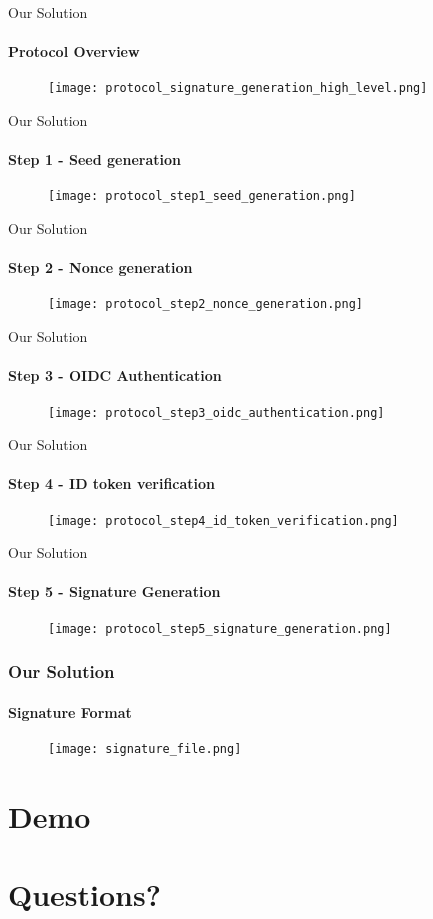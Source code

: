 \begin{frame}[t]{Our Solution}
	\framesubtitle{Protocol Overview}
	\begin{figure}[ht]
		\centering
		\texttt{[image: protocol\_signature\_generation\_high\_level.png]}
	\end{figure}
\end{frame}

\begin{frame}[t]{Our Solution}
	\framesubtitle{Step 1 - Seed generation}
	\begin{figure}[ht]
		\centering
		\texttt{[image: protocol\_step1\_seed\_generation.png]}
	\end{figure}
\end{frame}

\begin{frame}[t]{Our Solution}
	\framesubtitle{Step 2 - Nonce generation}
	\begin{figure}[ht]
		\centering
		\texttt{[image: protocol\_step2\_nonce\_generation.png]}
	\end{figure}
\end{frame}

\begin{frame}[t]{Our Solution}
	\framesubtitle{Step 3 - OIDC Authentication}
	\begin{figure}[ht]
		\centering
		\texttt{[image: protocol\_step3\_oidc\_authentication.png]}
	\end{figure}
\end{frame}

\begin{frame}[t]{Our Solution}
	\framesubtitle{Step 4 - ID token verification}
	\begin{figure}[ht]
		\centering
		\texttt{[image: protocol\_step4\_id\_token\_verification.png]}
	\end{figure}
\end{frame}

\begin{frame}[t]{Our Solution}
	\framesubtitle{Step 5 - Signature Generation}
	\begin{figure}[ht]
		\centering
		\texttt{[image: protocol\_step5\_signature\_generation.png]}
	\end{figure}
\end{frame}

\begin{frame}[t]\frametitle{Our Solution}
	\framesubtitle{Signature Format}
	\begin{figure}[ht]
		\centering
		\texttt{[image: signature\_file.png]}
	\end{figure}
\end{frame}

\section{Demo}
\sectionpage

\section{Questions?}
\sectionpage
